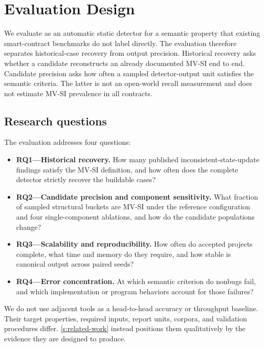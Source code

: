 
\section{Evaluation Design}
\label{s:evaluation-design}

We evaluate \sys as an automatic static detector for a semantic property that existing smart-contract benchmarks do not label directly. The evaluation therefore separates historical-case recovery from output precision. Historical recovery asks whether a candidate reconstructs an already documented MV-SI end to end. Candidate precision asks how often a sampled detector-output unit satisfies the semantic criteria. The latter is not an open-world recall measurement and does not estimate MV-SI prevalence in all contracts.

\subsection{Research questions}
\label{s:evaluation-rqs}

The evaluation addresses four questions:
\begin{itemize}[leftmargin=*,nosep]
  \item \textbf{RQ1---Historical recovery.} How many published inconsistent-state-update findings satisfy the MV-SI definition, and how often does the complete detector strictly recover the buildable cases?
  \item \textbf{RQ2---Candidate precision and component sensitivity.} What fraction of sampled structural buckets are MV-SI under the reference configuration and four single-component ablations, and how do the candidate populations change?
  \item \textbf{RQ3---Scalability and reproducibility.} How often do accepted projects complete, what time and memory do they require, and how stable is canonical output across paired seeds?
  \item \textbf{RQ4---Error concentration.} At which semantic criterion do nonbugs fail, and which implementation or program behaviors account for those failures?
\end{itemize}

We do not use adjacent tools as a head-to-head accuracy or throughput baseline. Their target properties, required inputs, report units, corpora, and validation procedures differ. \autoref{s:related-work} instead positions them qualitatively by the evidence they are designed to produce.

